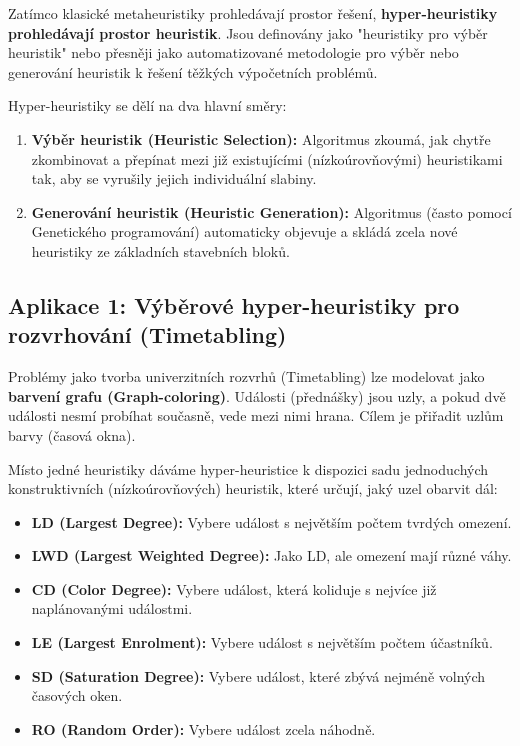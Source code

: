\documentclass[12pt,a4paper]{article}
\theoremstyle{definition}
\begin{document}
Zatímco klasické metaheuristiky prohledávají prostor řešení, \textbf{hyper-heuristiky prohledávají prostor heuristik}. Jsou definovány jako "heuristiky pro výběr heuristik" nebo přesněji jako automatizované metodologie pro výběr nebo generování heuristik k řešení těžkých výpočetních problémů. 

Hyper-heuristiky se dělí na dva hlavní směry:
\begin{enumerate}
    \item \textbf{Výběr heuristik (Heuristic Selection):} Algoritmus zkoumá, jak chytře zkombinovat a přepínat mezi již existujícími (nízkoúrovňovými) heuristikami tak, aby se vyrušily jejich individuální slabiny.
    \item \textbf{Generování heuristik (Heuristic Generation):} Algoritmus (často pomocí Genetického programování) automaticky objevuje a skládá zcela nové heuristiky ze základních stavebních bloků.
\end{enumerate}

\subsection{Aplikace 1: Výběrové hyper-heuristiky pro rozvrhování (Timetabling)}
Problémy jako tvorba univerzitních rozvrhů (Timetabling) lze modelovat jako \textbf{barvení grafu (Graph-coloring)}. Události (přednášky) jsou uzly, a pokud dvě události nesmí probíhat současně, vede mezi nimi hrana. Cílem je přiřadit uzlům barvy (časová okna).

Místo jedné heuristiky dáváme hyper-heuristice k dispozici sadu jednoduchých konstruktivních (nízkoúrovňových) heuristik, které určují, jaký uzel obarvit dál:
\begin{itemize}
    \item \textbf{LD (Largest Degree):} Vybere událost s největším počtem tvrdých omezení.
    \item \textbf{LWD (Largest Weighted Degree):} Jako LD, ale omezení mají různé váhy.
    \item \textbf{CD (Color Degree):} Vybere událost, která koliduje s nejvíce již naplánovanými událostmi.
    \item \textbf{LE (Largest Enrolment):} Vybere událost s největším počtem účastníků.
    \item \textbf{SD (Saturation Degree):} Vybere událost, které zbývá nejméně volných časových oken.
    \item \textbf{RO (Random Order):} Vybere událost zcela náhodně.
\end{itemize}
\end{document}
